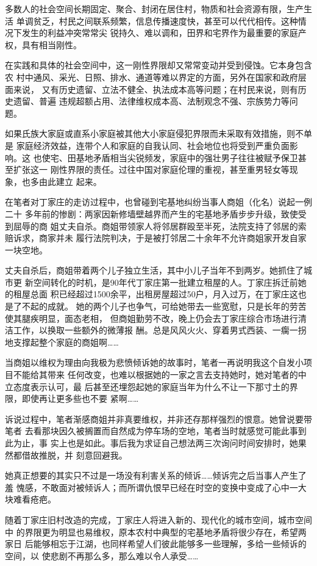 多数人的社会空间长期固定、聚合、封闭在居住村，物质和社会资源有限，生产生活
单调贫乏，村民之间联系频繁，信息传播速度快，甚至可以代代相传。这种情况下发生的利益冲突常常尖
锐持久、难以调和，田界和宅界作为最重要的家庭产权，具有相当刚性。

在实践和具体的社会空间中，这一刚性界限却又常常变动并受到侵蚀。它本身包含农
村中通风、采光、日照、排水、通道等难以界定的方面，另外在国家和政府层面来说，
又有历史遗留、立法不健全、执法成本高等问题；在村民来说，则有历史遗留、普遍
违规超额占用、法律维权成本高、法制观念不强、宗族势力等问题。

如果氏族大家庭或直系小家庭被其他大小家庭侵犯界限而未采取有效措施，则不单是
家庭经济效益，连带个人和家庭的自我认同、社会地位也将受到严重负面影响。这
也使宅、田基地矛盾相当尖锐频发，家庭中的强壮男子往往被赋予保卫甚至扩张这一
刚性界限的责任。过往中国对家庭伦理的重视，甚至重男轻女等现象，也多由此建立
起来。

在笔者对丁家庄的走访过程中，也曾碰到宅基地纠纷当事人商姐（化名）说起一例二十
多年前的惨剧：两家因新修墙壁越界而产生的宅基地矛盾步步升级，致使受到屈辱的商
姐丈夫自杀。商姐带领家人将邻居群殴至半死，法院支持了邻居的索赔诉求，商家并未
履行法院判决，于是被打邻居二十余年不允许商姐家开发自家一块空地。

丈夫自杀后，商姐带着两个儿子独立生活，其中小儿子当年不到两岁。她抓住了城市更
新空间转化的时机，是90年代丁家庄第一批建立租屋的人。丁家庄拆迁前她的租屋总面
积已经超过1500余平，出租房屋超过50户，月入过万，在丁家庄这也是了不起的成就。
她的两个儿子也争气，可给她带去一些宽慰，只是长年的劳苦使其腿疾明显，面态老相，
但商姐勤劳不改，晚上仍会去丁家庄综合市场进行清洁工作，以换取一些额外的微薄报
酬。总是风风火火、穿着男式西装、一瘸一拐地支撑起整个家庭的商姐啊……

当商姐以维权为理由向我极为悲愤倾诉她的故事时，笔者一再说明我这个自发小项目不能给其带来
任何改变，也难以根据她的一家之言去支持她时，她对笔者的中立态度表示认可，最
后甚至还埋怨起她的家庭当年为什么不让一下那寸土的界限，即使再让更多些也不要
紧啊……

诉说过程中，笔者渐感商姐并非真要维权，并非还存那样强烈的恨意。她曾说要带笔者
去看那块因久被搁置而自然成为停车场的空地，笔者当时就感觉可能此事到此为止，事
实上也是如此。事后我为求证自己想法两三次询问时间安排时，她果然都借故推脱，并
刻意回避我。

她真正想要的其实只不过是一场没有利害关系的倾诉……倾诉完之后当事人产生了羞
愧感，不敢面对被倾诉人；而所谓仇恨早已经在时空的变换中变成了心中一大块难看疮疤。

随着丁家庄旧村改造的完成，丁家庄人将进入新的、现代化的城市空间，城市空间中
的界限更为明显也易维权，原本农村中典型的宅基地矛盾将很少存在，希望两家日
后能够相忘于江湖，也同样希望人们彼此能够多一些理解，多给一些倾诉的空间，以
使悲剧不再那么多，那么难以令人承受……



